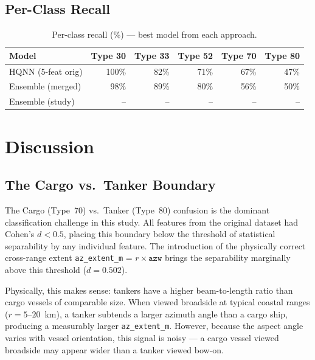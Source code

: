 \documentclass[12pt, a4paper]{article}
\begin{document}
\subsection{Per-Class Recall}

\begin{table}[H]
\centering
\caption{Per-class recall (\%) — best model from each approach.}
\label{tab:per_class}
\begin{tabular}{lrrrrr}
\toprule
\textbf{Model} & \textbf{Type 30} & \textbf{Type 33} & \textbf{Type 52}
               & \textbf{Type 70} & \textbf{Type 80} \\
\midrule
HQNN (5-feat orig) & 100\% & 82\% & 71\% & 67\% & 47\% \\
Ensemble (merged)  & 98\%  & 89\% & 80\% & 56\% & 50\% \\
Ensemble (study)   & --    & --   & --   & --   & -- \\
\bottomrule
\end{tabular}
\end{table}

\section{Discussion}
\label{sec:discussion}

\subsection{The Cargo vs.\ Tanker Boundary}

The Cargo (Type~70) vs.\ Tanker (Type~80) confusion is the dominant classification
challenge in this study. All features from the original dataset had Cohen's
$d < 0.5$, placing this boundary below the threshold of statistical separability
by any individual feature. The introduction of the physically correct
cross-range extent \texttt{az\_extent\_m} = $r \times \texttt{azw}$ brings
the separability marginally above this threshold ($d = 0.502$).

Physically, this makes sense: tankers have a higher beam-to-length ratio than
cargo vessels of comparable size. When viewed broadside at typical coastal ranges
($r = 5$--$20$~km), a tanker subtends a larger azimuth angle than a cargo ship,
producing a measurably larger \texttt{az\_extent\_m}. However, because the
aspect angle varies with vessel orientation, this signal is noisy —
a cargo vessel viewed broadside may appear wider than a tanker viewed bow-on.
\end{document}
